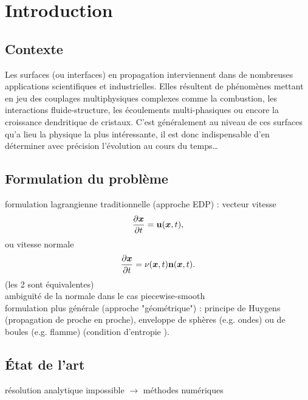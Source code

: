 \def\chapterabstract{}
\chapter*{Introduction}

\section*{Contexte}%
Les surfaces (ou interfaces) en propagation interviennent dans de nombreuses applications scientifiques et industrielles. Elles résultent de phénomènes mettant en jeu des couplages multiphysiques complexes comme la combustion, les interactions fluide-structure, les écoulements multi-phasiques ou encore la croissance dendritique de cristaux. C’est généralement au niveau de ces surfaces qu’a lieu la physique la plus intéressante, il est donc indispensable d’en déterminer avec précision l’évolution au cours du temps\ldots


\section*{Formulation du problème}%
formulation lagrangienne traditionnelle (approche EDP) : vecteur vitesse 
\begin{equation}
	\frac{\partial \boldsymbol{x}}{\partial t} = \mathbf{u}(\boldsymbol{x},t),
\end{equation}
ou vitesse normale 
\begin{equation}
	\frac{\partial \boldsymbol{x}}{\partial t} = \nu(\boldsymbol{x},t) \mathbf{n}(\boldsymbol{x},t).
\end{equation}
(les 2 sont équivalentes)\\
ambiguïté de la normale dans le cas piecewise-smooth\\
formulation plus générale (approche "géométrique") : principe de Huygens (propagation de proche en proche), enveloppe de sphères (e.g. ondes) ou de boules (e.g. flamme) (condition d'entropie \cite{sethian1999}).

\section*{État de l'art}
résolution analytique impossible $\to$ méthodes numériques\\
